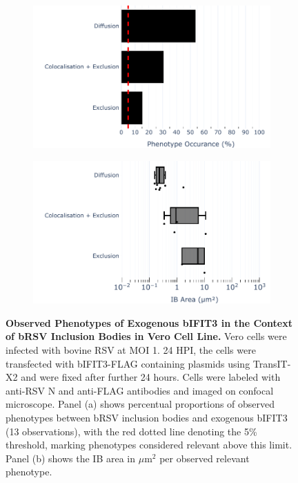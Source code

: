 \begin{figure}
    \begin{subfigure}{0.495\textwidth}
        \caption{}
        \includegraphics[width=1\linewidth]{09. Chapter 4/Figs/02. Overexpression/03. IFIT3/04. bar_i3_brsv.pdf} 
    \end{subfigure}
    \begin{subfigure}{0.495\textwidth}
        \caption{}
        \includegraphics[width=1\linewidth]{09. Chapter 4/Figs/02. Overexpression/03. IFIT3/05. box_i3_brsv.pdf}
    \end{subfigure}
    \caption[Observed Phenotypes of Exogenous bIFIT3 in the Context of bRSV Inclusion Bodies in Vero Cell Line.]{\textbf{Observed Phenotypes of Exogenous bIFIT3 in the Context of bRSV Inclusion Bodies in Vero Cell Line.} Vero cells were infected with bovine RSV at MOI 1. 24 HPI, the cells were transfected with bIFIT3-FLAG containing plasmids using TransIT-X2 and were fixed after further 24 hours. Cells were labeled with anti-RSV N and anti-FLAG antibodies and imaged on confocal microscope. Panel (a) shows percentual proportions of observed phenotypes between bRSV inclusion bodies and exogenous bIFIT3 (13 observations), with the red dotted line denoting the 5\% threshold, marking phenotypes considered relevant above this limit. Panel (b) shows the IB area in \(\mu \mbox{m}^2\) per observed relevant phenotype.}
    \label{fig:Observed Phenotypes of Exogenous bIFIT3 in the Context of bRSV Inclusion Bodies in VERO Cell Line}
\end{figure}

